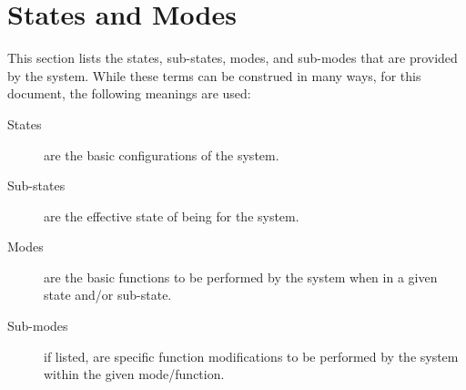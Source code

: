 \KNEADSECTIONNEWPAGE
\section{States and Modes}
\label{sec:StatesAndModes}


This section lists the states, sub-states, modes, and sub-modes that are provided by the system.
While these terms can be construed in many ways, for this document, the following meanings are used:
\begin{description}
	\item[States] are the basic configurations of the system.
	\item[Sub-states] are the effective state of being for the system.
	\item[Modes] are the basic functions to be performed by the system when in a given state and/or sub-state.
	\item[Sub-modes] if listed, are specific function modifications to be performed by the system within the given mode/function.
\end{description}

